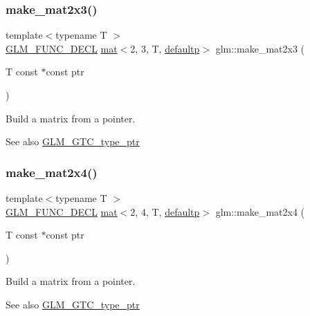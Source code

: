 \subsubsection{\texorpdfstring{make\+\_\+mat2x3()}{make\_mat2x3()}}
{\footnotesize\ttfamily template$<$typename T $>$ \\
\mbox{\hyperlink{setup_8hpp_ab2d052de21a70539923e9bcbf6e83a51}{G\+L\+M\+\_\+\+F\+U\+N\+C\+\_\+\+D\+E\+CL}} \mbox{\hyperlink{structglm_1_1mat}{mat}}$<$2, 3, T, \mbox{\hyperlink{namespaceglm_a36ed105b07c7746804d7fdc7cc90ff25a9d21ccd8b5a009ec7eb7677befc3bf51}{defaultp}}$>$ glm\+::make\+\_\+mat2x3 (\begin{DoxyParamCaption}\item[{T const $\ast$const}]{ptr }\end{DoxyParamCaption})}

Build a matrix from a pointer. \begin{DoxySeeAlso}{See also}
\mbox{\hyperlink{group__gtc__type__ptr}{G\+L\+M\+\_\+\+G\+T\+C\+\_\+type\+\_\+ptr}} 
\end{DoxySeeAlso}
\mbox{\label{group__gtc__type__ptr_ga078b862c90b0e9a79ed43a58997d8388}} 
\subsubsection{\texorpdfstring{make\+\_\+mat2x4()}{make\_mat2x4()}}
{\footnotesize\ttfamily template$<$typename T $>$ \\
\mbox{\hyperlink{setup_8hpp_ab2d052de21a70539923e9bcbf6e83a51}{G\+L\+M\+\_\+\+F\+U\+N\+C\+\_\+\+D\+E\+CL}} \mbox{\hyperlink{structglm_1_1mat}{mat}}$<$2, 4, T, \mbox{\hyperlink{namespaceglm_a36ed105b07c7746804d7fdc7cc90ff25a9d21ccd8b5a009ec7eb7677befc3bf51}{defaultp}}$>$ glm\+::make\+\_\+mat2x4 (\begin{DoxyParamCaption}\item[{T const $\ast$const}]{ptr }\end{DoxyParamCaption})}

Build a matrix from a pointer. \begin{DoxySeeAlso}{See also}
\mbox{\hyperlink{group__gtc__type__ptr}{G\+L\+M\+\_\+\+G\+T\+C\+\_\+type\+\_\+ptr}} 
\end{DoxySeeAlso}
\mbox{\label{group__gtc__type__ptr_ga611ee7c4d4cadfc83a8fa8e1d10a170f}} 
